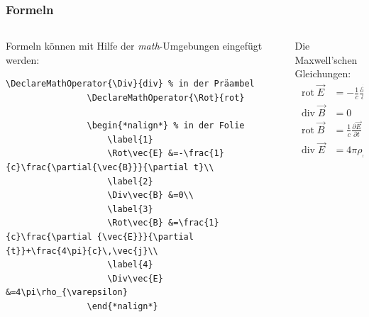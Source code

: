 \documentclass[german,notoc]{tudbeamer}%
\DeclareMathOperator{\Div}{div}
\DeclareMathOperator{\Rot}{rot}
\begin{document}
\begin{frame}[fragile]
	\frametitle{Formeln}

	\begin{columns}[T,onlytextwidth]
		\begin{column}[T]{.7\textwidth}
			Formeln können mit Hilfe der \emph{math}-Umgebungen eingefügt werden:
			\begin{lstlisting}[gobble=8,style=latex]				
				\DeclareMathOperator{\Div}{div} % in der Präambel
				\DeclareMathOperator{\Rot}{rot}

				\begin{*nalign*} % in der Folie
					\label{1}
					\Rot\vec{E} &=-\frac{1}{c}\frac{\partial{\vec{B}}}{\partial t}\\
					\label{2}
					\Div\vec{B} &=0\\
					\label{3}
					\Rot\vec{B} &=\frac{1}{c}\frac{\partial {\vec{E}}}{\partial {t}}+\frac{4\pi}{c}\,\vec{j}\\
					\label{4}
					\Div\vec{E} &=4\pi\rho_{\varepsilon}
				\end{*nalign*}
			\end{lstlisting} 
		\end{column}
		\begin{column}[T]{.295\textwidth}
			Die Maxwell'schen Gleichungen:
			\normalsize
			\begin{align}
				\label{1}
				\Rot\vec{E} &=-\frac{1}{c}\frac{\partial{\vec{B}}}{\partial t}
				\\
				\label{2}
				\Div\vec{B} &=0
				\\
				\label{3}
				\Rot\vec{B} &=\frac{1}{c}\frac{\partial {\vec{E}}}{\partial {t}}+\frac{4\pi}{c}\,\vec{j}
				\\
				\label{4}
				\Div\vec{E} &=4\pi\rho_{\varepsilon}
			\end{align}
		\end{column}
	\end{columns}
\end{frame}
\end{document}
